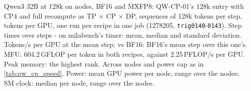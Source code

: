 \begin{table}[h]
  \caption{Qwen3 32B at 128k on \TriQwCpMxNodes{} nodes, BF16 and MXFP8: QW-CP-01's 128k entry with CP4 and full recompute as TP\TriQwCpTp{} $\times$ CP\TriQwCpMxSplit{} $\times$ DP\TriQwCpMxDp, \TriQwCpMxSeqs{} sequences of 128k tokens per step, \TriQwCpTokGpu{} tokens per GPU, one run per recipe in one job (1278205, \texttt{trig0140}-\texttt{0143}). Step times over steps \TriQwCpFrom-\TriQwCpSteps{} on milabench's timer: mean, median and standard deviation. Tokens/s per GPU at the mean step; vs BF16: BF16's mean step over this one's. MFU: 604.2\,GFLOP per token in both recipes, against 2.25\,PFLOP/s per GPU. Peak memory: the highest rank. Across nodes and power cap as in \cref{tab:qw_cp_speed}. Power: mean GPU power per node, range over the nodes; SM clock: median per node, range over the nodes.}
  \label{tab:qw_cp_mx}
  \centering\small
  \begin{adjustbox}{max width=\linewidth}
  \end{adjustbox}
\end{table}

